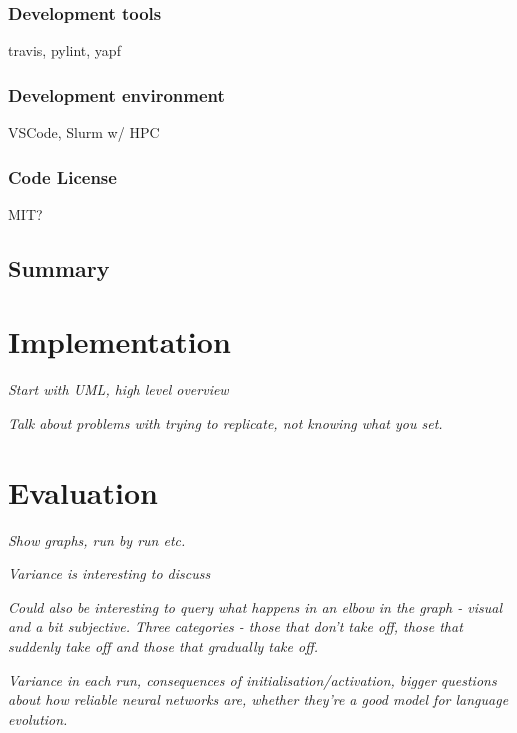 \documentclass[12pt,a4paper,twoside,openright]{report}
\begin{document}
\subsection{Development tools}

travis, pylint, yapf

\subsection{Development environment}

VSCode, Slurm w/ HPC 

\subsection{Code License}

MIT?

\section{Summary}


\chapter{Implementation}

\emph{Start with UML, high level overview}

\emph{Talk about problems with trying to replicate, not knowing what you set.}


\chapter{Evaluation}

\emph{Show graphs, run by run etc.}

\emph{Variance is interesting to discuss}

\emph{Could also be interesting to query what happens in an elbow in the graph - visual and a bit subjective. Three categories - those that don't take off, those that suddenly take off and those that gradually take off.}

\emph{Variance in each run, consequences of initialisation/activation, bigger questions about how reliable neural networks are, whether they're a good model for language evolution. }
\end{document}
